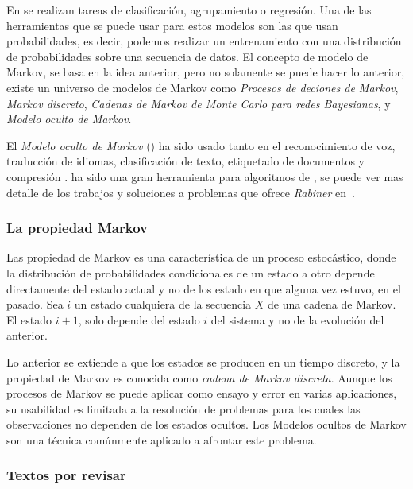 
En \machinelearning se realizan tareas de clasificación, agrupamiento o regresión. Una de las herramientas que se puede usar para estos modelos son las que usan probabilidades, es decir, podemos realizar un entrenamiento con una distribución de probabilidades sobre una secuencia de datos. El concepto de modelo de Markov, se basa en la idea anterior, pero no solamente se puede hacer lo anterior, existe un universo de modelos de Markov como \emph{Procesos de deciones de Markov}, \emph{Markov discreto}, \emph{Cadenas de Markov de Monte Carlo para redes Bayesianas}, y  \emph{Modelo oculto de Markov}.

El \emph{Modelo oculto de Markov} (\HMM) ha sido usado tanto en el reconocimiento de voz, traducción de idiomas, clasificación de texto, etiquetado de documentos y compresión \MLkhanna. \HMM ha sido una gran herramienta para algoritmos de \machinelearning, se puede ver mas detalle de los trabajos y soluciones a problemas que ofrece \emph{Rabiner} en~\cite{}.





\subsubsection{La propiedad Markov}



Las propiedad de Markov es una característica de un proceso estocástico, donde la distribución de probabilidades condicionales de un estado a otro depende directamente del estado actual y no de los estado en que alguna vez estuvo, en el pasado. Sea $i$ un estado cualquiera de la secuencia $X$ de una cadena de Markov.  El estado $i+1$, solo depende del estado $i$ del sistema y no de la evolución del anterior.


Lo anterior se extiende a que los estados se producen en un tiempo discreto, y la propiedad de Markov es conocida como \emph{cadena de Markov discreta}. Aunque los procesos de Markov se puede aplicar como ensayo y error en varias aplicaciones, su usabilidad es limitada a la resolución de problemas para los cuales las observaciones no dependen de los estados ocultos. Los Modelos ocultos de Markov son una técnica comúnmente aplicado a afrontar este problema.






\subsubsection{Textos por revisar}

